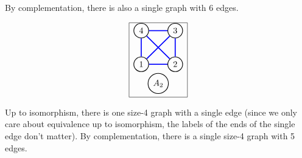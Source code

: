 By complementation, there is also a single graph with 6 edges.

\[
    \begin{array}{|l|}
    \hline
    \begin{tikzpicture}
[scale=.2]
\begin{scope}[every node/.style={circle,thick,draw}]
    \node (1) at (0,4) {1};
    \node (2) at (7,4) {2};
    \node (3) at (7,11) {3};
    \node (4) at (0,11) {4};
   \node(A) at (3.5,0) {$A_2$};
\end{scope}

\begin{scope}[%
              every node/.style={fill=white,circle},
              every edge/.style={draw=blue,very thick}]
     \draw (1) edge  (2);
     \draw (2) edge  (3);
     \draw (3) edge  (4);
     \draw (4) edge  (1);
     \draw (4) edge  (2);
     \draw (3) edge  (1);
             
\end{scope}
\end{tikzpicture}\\
\hline
\end{array}
\]

Up to isomorphism, there is one size-4 graph with a single edge (since we only care about equivalence up to isomorphism, the labels of the ends of the single edge don't matter). By complementation, there is a single size-4 graph with 5 edges. 


